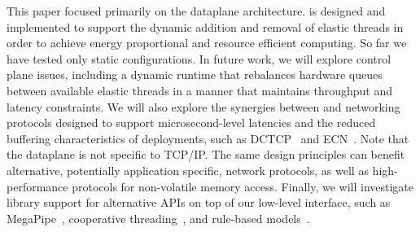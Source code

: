  This paper focused primarily on the \ix
dataplane architecture. \ix is designed and implemented to support the
dynamic addition and removal of elastic threads in order to achieve
energy proportional and resource efficient computing. So far we have
tested only static configurations. In future work, we will explore
control plane issues, including a
dynamic runtime that rebalances hardware queues between available
elastic threads in a manner that maintains throughput and latency
constraints.  We will also explore the synergies between \ix and
networking protocols designed to support microsecond-level latencies
and the reduced buffering characteristics of \ix deployments, such as
DCTCP~\cite{DBLP:conf/sigcomm/AlizadehGMPPPSS10} and
ECN~\cite{ramakrishnan2001addition}. Note that the \ix dataplane is
not specific to TCP/IP. The same design principles can benefit
alternative, potentially application specific, network protocols, as
well as high-performance protocols for non-volatile memory
access. Finally, we will investigate library support for alternative
APIs on top of our low-level interface, such as
MegaPipe~\cite{DBLP:conf/osdi/HanMCR12}, cooperative
threading~\cite{DBLP:conf/sosp/BehrenCZNB03}, and rule-based
models~\cite{DBLP:conf/hotos/StutsmanO13}.

